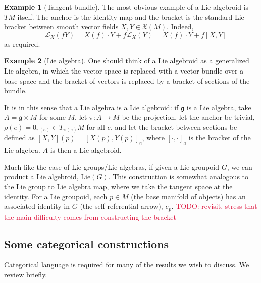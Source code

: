 \documentclass[aps,pra,showpacs,notitlepage,onecolumn,superscriptaddress,nofootinbib]{revtex4-1}
\newcommand{\pop}[1]{\textcolor{crimson}{#1}}
\theoremstyle{definition}
\newtheorem{example}{Example}[section]
\begin{document}
\begin{example}[Tangent bundle]
    The most obvious example of a Lie algebroid is $TM$ itself. The anchor is the identity map and the bracket is the standard Lie bracket between smooth vector fields $X, Y \in \mathfrak{X}(M)$. Indeed,
    \begin{equation}
        [X, fY] = \mathcal{L}_{X}(fY) = X(f) \cdot Y + f \mathcal{L}_X(Y) = X(f) \cdot Y + f [X, Y]
    \end{equation}
    as required.
\end{example}

\begin{example}[Lie algebra]
    One should think of a Lie algebroid as a generalized Lie algebra, in which the vector space is replaced with a vector bundle over a base space and 
    the bracket of vectors is replaced by a bracket of sections of the bundle. 
    
    It is in this sense that a Lie algebra is a Lie algebroid: if $\mathfrak{g}$
    is a Lie algebra, take $A = \mathfrak{g} \times M$ for some $M$, let $\pi : A \rightarrow M$ be the projection, let the anchor be trivial, $\rho(e) = 0_{\pi(e)} \in T_{\pi(e)}M$ for all $e$, 
and let the bracket between sections be defined as $[X, Y](p) = [X(p), Y(p)]_{\mathfrak{g}}$, where $[\cdot, \cdot]_{\mathfrak{g}}$ is the bracket of the Lie algebra. $A$ is then a Lie algebroid.
\end{example}

\noindent Much like the case of Lie groups/Lie algebras, if given a Lie groupoid $G$, we can product a Lie algebroid, $\text{Lie}(G)$. This construction 
is somewhat analogous to the Lie group to Lie algebra map, where we take the tangent space at the identity. For a Lie groupoid, each $p \in M$ (the base manifold of objects)
has an associated identity in $G$ (the self-referential arrow), $e_p$. \pop{TODO: revisit, stress that the main difficulty comes from constructing the bracket}

\subsection{Some categorical constructions}

\noindent Categorical language is required for many of the results we wish to discuss. We review briefly.
\end{document}
